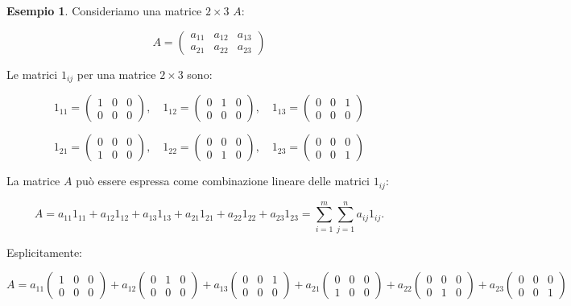 \documentclass{article}
\theoremstyle{plain}
\theoremstyle{definition}
\newtheorem{exmp}{Esempio}[section]
\theoremstyle{remark}
\begin{document}
\vspace{10pt}

\begin{exmp}
Consideriamo una matrice \(2 \times 3\) \( A \):

\[
A = \begin{pmatrix}
a_{11} & a_{12} & a_{13} \\
a_{21} & a_{22} & a_{23}
\end{pmatrix}
\]

Le matrici \(1_{ij}\) per una matrice \(2 \times 3\) sono:

\[
1_{11} = \begin{pmatrix}
1 & 0 & 0 \\
0 & 0 & 0
\end{pmatrix}, \quad
1_{12} = \begin{pmatrix}
0 & 1 & 0 \\
0 & 0 & 0
\end{pmatrix}, \quad
1_{13} = \begin{pmatrix}
0 & 0 & 1 \\
0 & 0 & 0
\end{pmatrix}
\]

\[
1_{21} = \begin{pmatrix}
0 & 0 & 0 \\
1 & 0 & 0
\end{pmatrix}, \quad
1_{22} = \begin{pmatrix}
0 & 0 & 0 \\
0 & 1 & 0
\end{pmatrix}, \quad
1_{23} = \begin{pmatrix}
0 & 0 & 0 \\
0 & 0 & 1
\end{pmatrix}
\]

La matrice \( A \) può essere espressa come combinazione lineare delle matrici \(1_{ij}\):

\[
A = a_{11}1_{11} + a_{12}1_{12} + a_{13}1_{13} + a_{21}1_{21} + a_{22}1_{22} + a_{23}1_{23} = \sum_{i=1}^{m}\sum_{j=1}^{n}a_{ij}1_{ij}.
\]

Esplicitamente:

\[
A = a_{11} \begin{pmatrix}
1 & 0 & 0 \\
0 & 0 & 0
\end{pmatrix}
+ a_{12} \begin{pmatrix}
0 & 1 & 0 \\
0 & 0 & 0
\end{pmatrix}
+ a_{13} \begin{pmatrix}
0 & 0 & 1 \\
0 & 0 & 0
\end{pmatrix}
+ a_{21} \begin{pmatrix}
0 & 0 & 0 \\
1 & 0 & 0
\end{pmatrix}
+ a_{22} \begin{pmatrix}
0 & 0 & 0 \\
0 & 1 & 0
\end{pmatrix}
+ a_{23} \begin{pmatrix}
0 & 0 & 0 \\
0 & 0 & 1
\end{pmatrix}
\]


\end{exmp}
\end{document}
